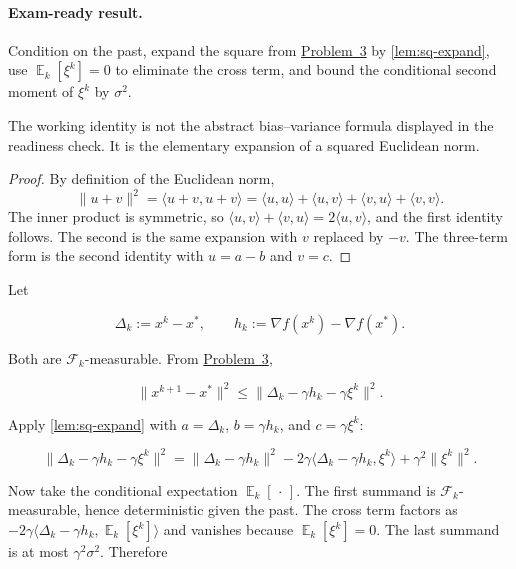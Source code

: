 \documentclass[11pt,a4paper]{article}
\DeclareMathOperator{\E}{\mathbb{E}}
\newcommand{\jump}[2]{\hyperref[#1]{#2}}
\theoremstyle{definition}
\begin{document}
\paragraph{Exam-ready result.}
Condition on the past, expand the square from \jump{prob:spr2025-opt-3}{Problem~3} by \cref{lem:sq-expand}, use $\E_k[\xi^k]=0$ to eliminate the cross term, and bound the conditional second moment of $\xi^k$ by $\sigma^2$.

The working identity is not the abstract bias--variance formula displayed in the readiness check. It is the elementary expansion of a squared Euclidean norm.


\begin{proof}
By definition of the Euclidean norm,
\[
\|u+v\|^2
=\langle u+v,u+v\rangle
=\langle u,u\rangle+\langle u,v\rangle+\langle v,u\rangle+\langle v,v\rangle.
\]
The inner product is symmetric, so $\langle u,v\rangle+\langle v,u\rangle=2\langle u,v\rangle$, and the first identity follows. The second is the same expansion with $v$ replaced by $-v$. The three-term form is the second identity with $u=a-b$ and $v=c$.
\end{proof}

Let

\[
\Delta_k:=x^k-x^*,
\qquad
h_k:=\nabla f(x^k)-\nabla f(x^*).
\]

Both are $\mathcal{F}_k$-measurable. From \jump{prob:spr2025-opt-3}{Problem~3},

\[
\|x^{k+1}-x^*\|^2
\leq\|\Delta_k-\gamma h_k-\gamma\xi^k\|^2.
\]

Apply \cref{lem:sq-expand} with $a=\Delta_k$, $b=\gamma h_k$, and $c=\gamma\xi^k$:

\[
\|\Delta_k-\gamma h_k-\gamma\xi^k\|^2
=\|\Delta_k-\gamma h_k\|^2
-2\gamma\langle\Delta_k-\gamma h_k,\xi^k\rangle
+\gamma^2\|\xi^k\|^2.
\]

Now take the conditional expectation $\E_k[\,\cdot\,]$. The first summand is $\mathcal{F}_k$-measurable, hence deterministic given the past. The cross term factors as $-2\gamma\langle\Delta_k-\gamma h_k,\E_k[\xi^k]\rangle$ and vanishes because $\E_k[\xi^k]=0$. The last summand is at most $\gamma^2\sigma^2$. Therefore
\end{document}
